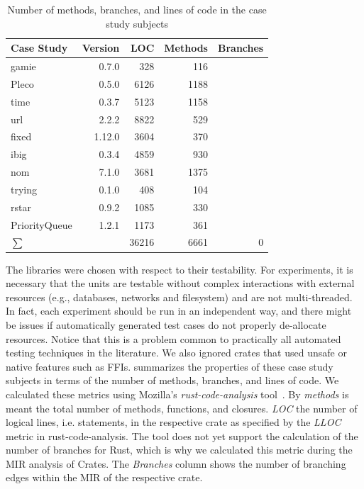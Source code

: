 \documentclass[paper=a4,%
  twoside,%
  BCOR4mm,%
  abstract=true,%
  toc=bibliography,%
  chapterprefix=true,%
  toc=bibliographynumbered,%
  open=right,%
  english,%
  pagesize=pdftex]{scrreprt}
\newcommand{\loc}{36216\xspace}
\newcommand{\methodsnum}{6661\xspace}
\newcommand{\branches}{0\xspace}
\newcommand{\mir}{\ac{MIR}\xspace}
\begin{document}
\begin{table}[]
\begin{tabular*}{\textwidth}{l @{\extracolsep{\fill}} rrrr}
\hline
\textbf{Case Study} & \textbf{Version} & \textbf{LOC} & \textbf{Methods} & \textbf{Branches} \\
\hline
gamie & 0.7.0 & 328 & 116 &  \\
Pleco & 0.5.0 & 6126 & 1188 &  \\
time & 0.3.7 & 5123 & 1158 &  \\
url & 2.2.2 & 8822 & 529 &  \\
fixed & 1.12.0 & 3604 & 370 &  \\
ibig & 0.3.4 & 4859 & 930 &  \\
nom & 7.1.0 & 3681 & 1375 &  \\
trying & 0.1.0 & 408 & 104 &  \\
rstar & 0.9.2 & 1085 & 330 &  \\
PriorityQueue & 1.2.1 & 1173 & 361 &  \\
\hline
$\sum$ &  & \loc & \methodsnum & \branches \\
\hline
\end{tabular*}
\caption{\label{tab:properties-of-case-study-subjects}Number of methods, branches, and lines of code in the case study subjects}
\end{table}
The libraries were chosen with respect to their testability. For experiments, it is necessary that the units are testable without complex interactions with external resources (e.g., databases, networks and filesystem) and are not multi-threaded. In fact, each experiment should be run in an independent way, and there might be issues if automatically generated test cases do not properly de-allocate resources. Notice that this is a problem common to practically all automated testing techniques in the literature. We also ignored crates that used unsafe or native features such as FFIs.  summarizes the properties of these case study subjects in terms of the number of methods, branches, and lines of code. We calculated these metrics using Mozilla's \emph{rust-code-analysis} tool~\cite{Ardito2020}. By \emph{methods} is meant the total number of methods, functions, and closures. \emph{LOC} the number of logical lines, i.e. statements, in the respective crate as specified by the \emph{LLOC} metric in rust-code-analysis. The tool does not yet support the calculation of the number of branches for Rust, which is why we calculated this metric during the MIR analysis of Crates. The \emph{Branches} column shows the number of branching edges within the \mir of the respective crate. 
\end{document}

